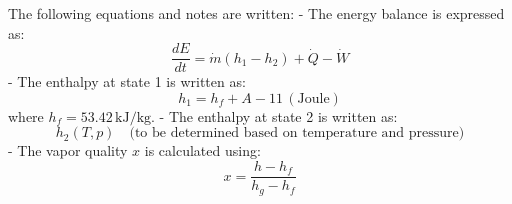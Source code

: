 The following equations and notes are written:  
- The energy balance is expressed as:  
  \[
  \frac{dE}{dt} = \dot{m} (h_1 - h_2) + \dot{Q} - \dot{W}
  \]  
- The enthalpy at state 1 is written as:  
  \[
  h_1 = h_f + A - 11 \, (\text{Joule})
  \]  
  where \( h_f = 53.42 \, \text{kJ/kg} \).  
- The enthalpy at state 2 is written as:  
  \[
  h_2(T, p) \quad \text{(to be determined based on temperature and pressure)}  
  \]  
- The vapor quality \( x \) is calculated using:  
  \[
  x = \frac{h - h_f}{h_g - h_f}
  \]